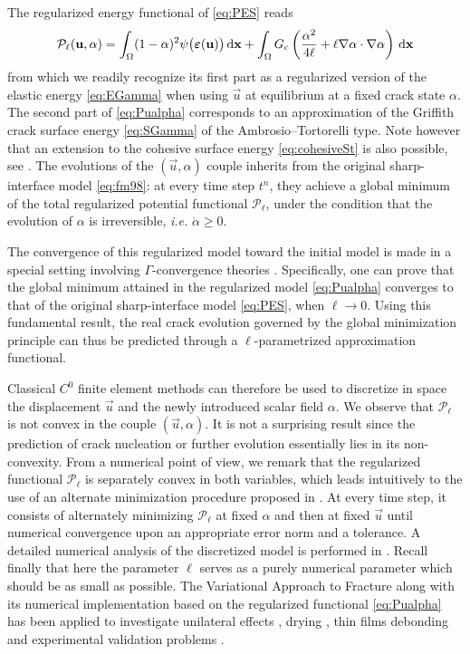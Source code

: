 The regularized energy functional of \eqref{eq:PES} reads
\begin{equation} \label{eq:Pualpha}
\mathcal{P}_\ell(\vec{u},\alpha)=\int_\Omega(1-\alpha)^2\psi\bigl(\eps(\vec{u})\bigr)\dx+\int_\Omega\gc\left(\frac{\alpha^2}{4\ell}+\ell\nabla\alpha\cdot\nabla\alpha\right)\dx
\end{equation}
from which we readily recognize its first part as a regularized version of the elastic energy \eqref{eq:EGamma} when using $\vec{u}$ at equilibrium at a fixed crack state $\alpha$. The second part of \eqref{eq:Pualpha} corresponds to an approximation of the Griffith crack surface energy \eqref{eq:SGamma} of the Ambrosio--Tortorelli type. Note however that an extension to the cohesive surface energy \eqref{eq:cohesiveSt} is also possible, see \cite{ContiFocardiIurlano:2015}. The evolutions of the $(\vec{u},\alpha)$ couple inherits from the original sharp-interface model \eqref{eq:fm98}: at every time step $t^n$, they achieve a global minimum of the total regularized potential functional $\mathcal{P}_\ell$, under the condition that the evolution of $\alpha$ is irreversible, \emph{i.e.} $\dot{\alpha}\geq 0$.

The convergence of this regularized model toward the initial model is made in a special setting involving $\Gamma$-convergence theories \cite{Braides:2002}. Specifically, one can prove that the global minimum attained in the regularized model \eqref{eq:Pualpha} converges to that of the original sharp-interface model \eqref{eq:PES}, when $\ell\to 0$. Using this fundamental result, the real crack evolution governed by the global minimization principle can thus be predicted through a $\ell$-parametrized approximation functional. 

Classical $C^0$ finite element methods can therefore be used to discretize in space the displacement $\vec{u}$ and the newly introduced scalar field $\alpha$. We observe that $\mathcal{P}_\ell$ is not convex in the couple $(\vec{u},\alpha)$. It is not a surprising result since the prediction of crack nucleation or further evolution essentially lies in its non-convexity. From a numerical point of view, we remark that the regularized functional $\mathcal{P}_\ell$ is separately convex in both variables, which leads intuitively to the use of an alternate minimization procedure proposed in \cite{BourdinFrancfortMarigo:2000}. At every time step, it consists of alternately minimizing $\mathcal{P}_\ell$ at fixed $\alpha$ and then at fixed $\vec{u}$ until numerical convergence upon an appropriate error norm and a tolerance. A detailed numerical analysis of the discretized model is performed in \cite{BourdinFrancfortMarigo:2008}. Recall finally that here the parameter $\ell$ serves as a purely numerical parameter which should be as small as possible. The Variational Approach to Fracture along with its numerical implementation based on the regularized functional \eqref{eq:Pualpha} has been applied to investigate unilateral effects \cite{PieroLancioniMarch:2007,AmorMarigoMaurini:2009}, drying \cite{MauriniBourdinGauthierLazarus:2013}, thin films debonding \cite{Baldelli:2014} and experimental validation problems \cite{MesgarnejadBourdinKhonsari:2014}.

